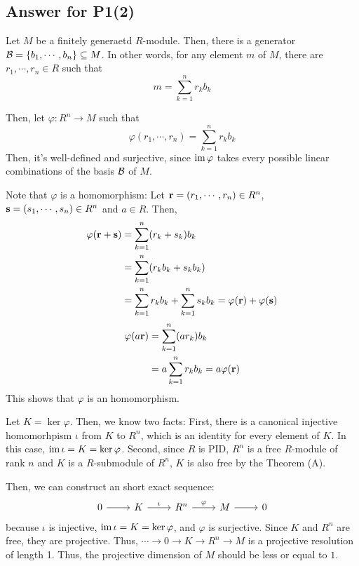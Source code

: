 \subsection*{Answer for P1(2)}

Let \(M\) be a finitely generaetd \(R\)-module.
Then, there is a generator \(\mathcal{B} = \{b_1, \cdots, b_n\} \subseteq M\).
In other words, for any element \(m\) of \(M\),
there are \(r_1, \cdots, r_n \in R\) such that
\[m = \sum_{k=1}^n r_k b_k\]

Then, let \(\varphi: R^n \to M\) such that
\[\varphi(r_1, \cdots, r_n) = \sum_{k=1}^n r_k b_k\]
Then, it's well-defined and surjective, since \(\textnormal{im}\, \varphi\) takes
every possible linear combinations of the basis \(\mathcal{B}\) of \(M\).

Note that \(\varphi\) is a homomorphism:
Let \(\mathbf{r} = (r_1, \cdots, r_n) \in R^n\),
\(\mathbf{s} = (s_1, \cdots, s_n) \in R^n\)
and \(a \in R\).
Then,
\begin{align*}
  \varphi(\mathbf{r} + \mathbf{s})
  &= \sum_{k=1}^n (r_k + s_k) b_k
  \\&= \sum_{k=1}^n (r_k b_k + s_k b_k)
  \\&= \sum_{k=1}^n r_k b_k  + \sum_{k=1}^n s_k b_k
  = \varphi(\mathbf{r}) + \varphi(\mathbf{s})
\end{align*}
\begin{align*}
  \varphi(a \mathbf{r})
  &= \sum_{k=1}^n (a r_k)  b_k
  \\&= a \sum_{k=1}^n r_k  b_k
  = a \varphi(\mathbf{r})
\end{align*}
This shows that \(\varphi\) is an homomorphism.

Let \(K = \ker \varphi\).
Then, we know two facts:
First, there is a canonical injective homomorhpism \(\iota\) from \(K\) to \(R^n\),
which is an identity for every element of \(K\).
In this case, \(\textnormal{im}\, \iota = K = \ker \varphi\).
Second, since \(R\) is PID, \(R^n\) is a free \(R\)-module of rank \(n\)
and \(K\) is a \(R\)-submodule of \(R^n\),
\(K\) is also free by the Theorem (A).

Then, we can construct an short exact sequence:
\[\begin{tikzcd}
  0 \ar{r} & K \ar["\iota"]{r} & R^n \ar["\varphi"]{r} & M \ar{r} & 0
\end{tikzcd}\]
because \(\iota\) is injective, \(\textnormal{im}\, \iota = K = \ker \varphi\), and \(\varphi\) is surjective.
Since \(K\) and \(R^n\) are free, they are projective.
Thus, \(\cdots \to 0 \to K \to R^n \to M\)
is a projective resolution of length 1.
Thus, the projective dimension of \(M\) should be less or equal to \(1\).
\qedsq

